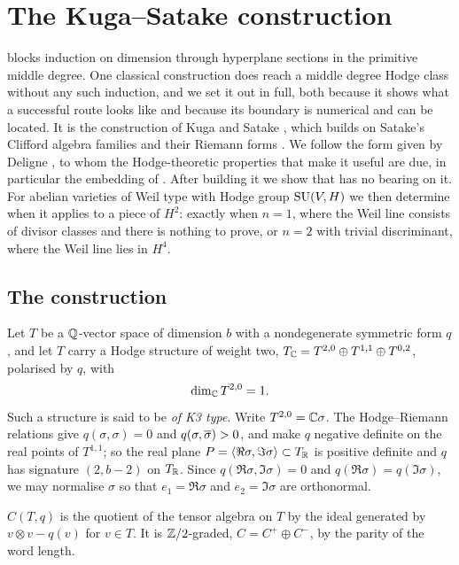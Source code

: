 \section{The Kuga--Satake construction}\label{sec:ks}

 blocks induction on dimension through hyperplane
sections in the primitive middle degree. One classical construction does reach
a middle degree Hodge class without any such induction, and we set it out in
full, both because it shows what a successful route looks like and because
its boundary is numerical and can be located. It is the construction of Kuga
and Satake \cite{KS67}, which builds on Satake's Clifford algebra families and
their Riemann forms \cite{Sat66}. We follow the form given by Deligne
\cite{Del72}, to whom the Hodge-theoretic properties that make it useful are
due, in particular the embedding of . After building it we
show that  has no bearing on it. For abelian varieties of
Weil type with Hodge group $\operatorname{SU}(V,H)$ we then determine when it applies to a
piece of $H^{2}$: exactly when $n=1$, where the Weil line consists of divisor
classes and there is nothing to prove, or $n=2$ with trivial discriminant,
where the Weil line lies in $H^{4}$.

\subsection{The construction}

\begin{setupenv}[K3 type]\label{setup:k3type}
Let $T$ be a $\mathbb{Q}$-vector space of dimension $b$ with a nondegenerate
symmetric form $q$, and let $T$ carry a Hodge structure of weight two,
$T_{\mathbb{C}}=T^{2,0}\oplus T^{1,1}\oplus T^{0,2}$, polarised by $q$, with
\[
  \dim_{\mathbb{C}}T^{2,0}=1 .
\]
Such a structure is said to be \emph{of K3 type}. Write $T^{2,0}=\mathbb{C}\sigma$.
The Hodge--Riemann relations give $q(\sigma,\sigma)=0$ and
$q(\sigma,\overline{\sigma})>0$, and make $q$ negative definite on the real points
of $T^{1,1}$; so the real plane
$P=\langle\Re\sigma,\Im\sigma\rangle\subset T_{\mathbb{R}}$ is positive definite and
$q$ has signature $(2,b-2)$ on $T_{\mathbb{R}}$. Since $q(\Re\sigma,\Im\sigma)=0$
and $q(\Re\sigma)=q(\Im\sigma)$, we may normalise $\sigma$ so that
$e_{1}=\Re\sigma$ and $e_{2}=\Im\sigma$ are orthonormal.
\end{setupenv}

\begin{definition}\label{def:clifford}
$C(T,q)$ is the quotient of the tensor algebra on $T$ by the ideal generated
by $v\otimes v-q(v)$ for $v\in T$. It is $\mathbb{Z}/2$-graded, $C=C^{+}\oplus C^{-}$,
by the parity of the word length.
\end{definition}


